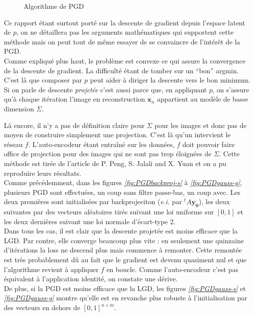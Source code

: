 \documentclass[hidelinks, french]{article} %
\newcommand{\ei}{\textit{e.i. }}
\renewcommand{\bf}[1]{\boldsymbol{#1}}
\theoremstyle{enonce}
\theoremstyle{special}
\theoremstyle{rq}
\theoremstyle{exo}
\theoremstyle{demo}
\begin{document}
\begin{wrapfigure}{r}{0.44\textwidth}
	
	\caption{Algorithme de PGD}
	\label{fig:pcode PGD}
\end{wrapfigure}
\noindent Ce rapport étant surtout porté sur la descente de gradient depuis l'espace latent de $p$, on ne détaillera pas les arguments mathématiques qui supportent cette méthode mais on peut tout de même essayer de se convaincre de l'intérêt de la PGD.\\
Comme expliqué plus haut, le problème est convexe ce qui assure la convergence de la descente de gradient. La difficulté étant de tomber sur un ``bon'' argmin. C'est là que composer par $p$ peut aider à diriger la descente vers le bon minimum. Si on parle de descente \emph{projetée} c'est aussi parce que, en appliquant $p$, on s'assure qu'à chaque itération l'image en reconstruction $\bf{x}_n$ appartient au modèle de basse dimension $\Sigma$.

Là encore, il n’y a pas de définition claire pour $\Sigma$ pour les images et donc pas de moyen de construire simplement une projection. C’est là qu’un intervient le réseau $f$.
L'auto-encodeur étant entraîné sur les données, $f$ doit pouvoir faire office de projection pour des images qui ne sont pas trop éloignées de $\Sigma$. Cette méthode est tirée de l'article \cite{peng_solving_2019} de P. Peng, S. Jalali and X. Yuan et on a pu reproduire leurs résultats. 
\\

Comme précédemment, dans les figures \textit{\ref{fig:PGDbackproj-s}} à \textit{\ref{fig:PGDgauss-g}}, plusieurs PGD sont effectuées, un coup sans filtre passe-bas, un coup avec. Les deux premières sont initialisées par backprojeciton (\ei par $^tA\bf{y_0}$), les deux suivantes par des vecteurs aléatoires tirés suivant une loi uniforme sur $[0,1]$ et les deux dernières suivant une loi normale d'écart-type 2.
\\
Dans tous les cas, il est clair que la descente projetée est moins efficace que la LGD. Par contre, elle converge beaucoup plus vite : en seulement une quinzaine d’itérations la loss ne descend plus mais commence à remonter. Cette remontée est très probablement dû au fait que le gradient est devenu quasiment nul et que l’algorithme revient à appliquer $f$ en boucle. Comme l'auto-encodeur c’est pas équivalent à l’application identité, on constate une dérive.
\\
De plus, si la PGD est moins efficace que la LGD, les figures \textit{\ref{fig:PGDgauss-s}} et \textit{\ref{fig:PGDgauss-g}} montre qu’elle est en revanche plus robuste à l’initialisation par des vecteurs en dehors de $[0,1]^{n\times m}$.
\\
\end{document}
